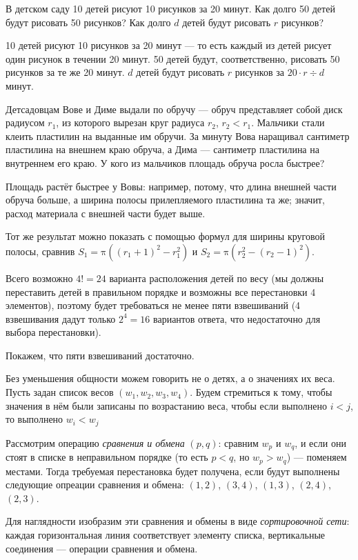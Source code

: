 \begin{itemize}
\itA В детском саду 10 детей рисуют 10 рисунков за 20 минут. Как долго 50 детей будут 
рисовать 50 рисунков? Как долго $d$ детей будут рисовать $r$ рисунков?

10 детей рисуют 10 рисунков за 20 минут --- то есть каждый из детей рисует один рисунок в течении 20 минут.
50 детей будут, соответственно, рисовать 50 рисунков за те же 20 минут.
$d$ детей будут рисовать $r$ рисунков за $20 \cdot r \div d$ минут.

\itB Детсадовцам Вове и Диме выдали по обручу — обруч представляет собой диск 
радиусом $r_1$, из которого вырезан круг радиуса $r_2$, $r_2<r_1$. Мальчики стали клеить 
пластилин на выданные им обручи. За минуту Вова наращивал сантиметр пластилина на внешнем краю 
обруча, а Дима — сантиметр пластилина на внутреннем его краю. У кого из мальчиков площадь обруча росла быстрее?

Площадь растёт быстрее у Вовы: например, потому, что длина внешней части обруча больше,
а ширина полосы прилепляемого пластилина та же; значит, расход материала с внешней части будет выше.

Тот же результат можно показать с помощью формул для ширины круговой полосы, сравнив
$S_1 = \text{π}((r_1+1)^2 - r_1^2)$ и $S_2 = \text{π}(r_2^2 - (r_2-1)^2)$.

\itC Всего возможно $4! = 24$ варианта расположения детей по весу (мы должны переставить 
детей в правильном порядке и возможны все перестановки 4 элементов), 
поэтому будет требоваться не менее пяти взвешиваний (4 взвешивания 
дадут только $2^4 = 16$ вариантов ответа, что недостаточно для выбора перестановки).

Покажем, что пяти взвешиваний достаточно. 

Без уменьшения общности можем говорить не о детях, а о значениях их веса.
Пусть задан список весов $(w_1,w_2,w_3,w_4)$. 
Будем стремиться к тому, чтобы значения в нём были записаны по возрастанию веса, чтобы
если выполнено $i < j$, то выполнено $w_i < w_j$

Рассмотрим операцию \emph{сравнения и обмена} $(p,q)$: сравним $w_p$ и $w_q$, и если они 
стоят в списке в неправильном порядке (то есть $p < q$, но $w_p > w_q$) --- 
поменяем местами. Тогда требуемая перестановка будет получена, если будут выполнены
следующие опреации сравнения и обмена: $(1,2)$, $(3,4)$, $(1,3)$, $(2,4)$, $(2,3)$.

Для наглядности изобразим эти сравнения и обмены в виде \emph{сортировочной сети}:
каждая горизонтальная линия соответствует элементу списка, вертикальные соединения ---
операции сравнения и обмена.


\end{itemize}
